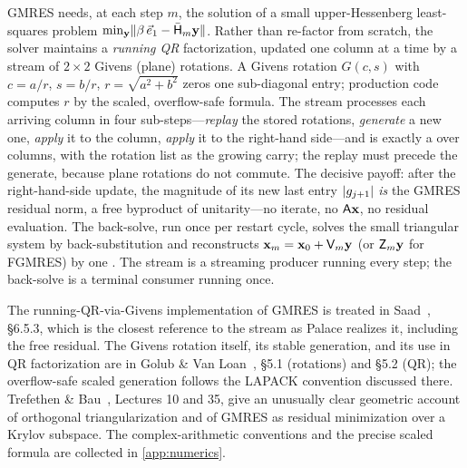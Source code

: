 \summarysection
GMRES needs, at each step $m$, the solution of a small upper-Hessenberg least-squares
problem $\min_{\mathbf{y}}\lVert\beta\,\vec e_1 - \bar{\mathsf{H}}_m\mathbf{y}\rVert$. Rather than re-factor from
scratch, the solver maintains a \emph{running QR} factorization, updated one column at a
time by a stream of $2\times2$ Givens (plane) rotations. A Givens rotation $G(c,s)$ with
$c = a/r$, $s = b/r$, $r = \sqrt{a^2+b^2}$ zeros one sub-diagonal entry; production code
computes $r$ by the scaled, overflow-safe formula. The stream processes each arriving
column in four sub-steps---\emph{replay} the stored rotations, \emph{generate} a new one,
\emph{apply} it to the column, \emph{apply} it to the right-hand side---and is exactly a
 over columns, with the rotation list as the growing carry; the replay must
precede the generate, because plane rotations do not commute. The decisive payoff: after
the right-hand-side update, the magnitude of its new last entry $\lvert g_{j+1}\rvert$ \emph{is}
the GMRES residual norm, a free byproduct of unitarity---no iterate, no $\mathsf{A}\mathbf{x}$, no
residual evaluation. The back-solve, run once per restart cycle, solves the small
triangular system by back-substitution and reconstructs $\mathbf{x}_m = \mathbf{x}_0 + \mathsf{V}_m\mathbf{y}$
(or $\mathsf{Z}_m\mathbf{y}$ for FGMRES) by one . The stream is a
streaming producer running every step; the back-solve is a terminal consumer running
once.

\furtherreading
The running-QR-via-Givens implementation of GMRES is treated in
Saad~\citep{saad2003}, \S6.5.3, which is the closest reference to the stream as Palace
realizes it, including the free residual. The Givens rotation itself, its stable
generation, and its use in QR factorization are in Golub \& Van
Loan~\citep{golubvanloan2013}, \S5.1 (rotations) and \S5.2 (QR); the overflow-safe scaled
generation follows the LAPACK convention discussed there. Trefethen \&
Bau~\citep{trefethenbau1997}, Lectures 10 and 35, give an unusually clear geometric
account of orthogonal triangularization and of GMRES as residual minimization over a
Krylov subspace. The complex-arithmetic conventions and the precise scaled formula are
collected in \cref{app:numerics}.


